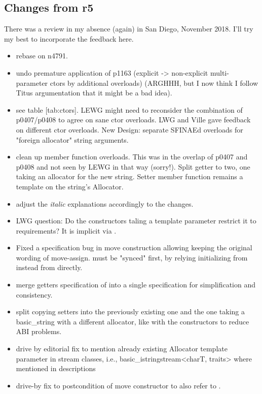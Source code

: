 \documentclass[ebook,11pt,article]{memoir}
\renewcommand{\ref}[1]{[#1]}
\begin{document}
\subsection{Changes from r5}
There was a review in my absence (again) in San Diego, November 2018. I'll try my best to incorporate the feedback here.
\begin{itemize}
\item rebase on n4791.
\item undo premature application of p1163 (explicit -> non-explicit multi-parameter ctors by additional overloads) (ARGHHH, but I now think I follow Titus argumentation that it might be a bad idea).
\item see table \ref{tab:ctors}. LEWG might need to reconsider the combination of p0407/p0408 to agree on sane ctor overloads. LWG and Ville gave feedback on different ctor overloads. New Design: separate SFINAEd overloads for "foreign allocator" string arguments.
\item clean up  member function overloads. This was in the overlap of p0407 and p0408 and not seen by LEWG in that way (sorry!). Split getter to two, one taking an allocator for the new string. Setter  member function remains a template on the string's Allocator. 
\item adjust the \emph{italic} explanations accordingly to the changes.
\item LWG question: Do the constructors taling a  template parameter restrict it  to  requirements? It is implicit via .
\item Fixed a specification bug in move construction allowing keeping the original wording of move-assign.  must be "synced" first, by relying initializing  from   instead from  directly.
\item merge getters  specification of  into a single specification for simplification and consistency.
\item split copying setters  into the previously existing one and the one taking a basic_string with a different allocator, like with the constructors to reduce ABI problems.
\item drive by editorial fix to mention already existing Allocator template parameter in stream classes, i.e., basic_istringstream<charT, traits> where mentioned in descriptions
\item drive-by fix to postcondition of  move constructor to also refer to .
\end{itemize}
\end{document}
